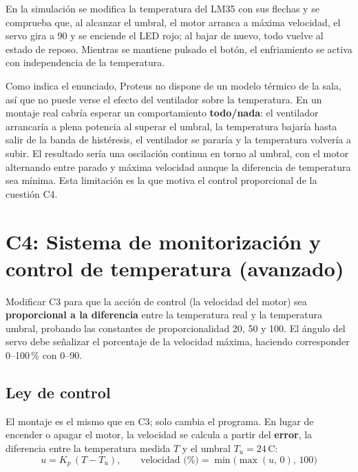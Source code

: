 \documentclass{upo-master}
\begin{document}
En la simulación se modifica la temperatura del LM35 con sus flechas y se
comprueba que, al alcanzar el umbral, el motor arranca a máxima velocidad, el
servo gira a 90\textdegree{} y se enciende el LED rojo; al bajar de nuevo, todo
vuelve al estado de reposo. Mientras se mantiene pulsado el botón, el
enfriamiento se activa con independencia de la temperatura.

Como indica el enunciado, Proteus no dispone de un modelo térmico de la
sala, así que no puede verse el efecto del ventilador sobre la temperatura.
En un montaje real cabría esperar un comportamiento \textbf{todo/nada}: el
ventilador arrancaría a plena potencia al superar el umbral, la temperatura
bajaría hasta salir de la banda de histéresis, el ventilador se pararía y la
temperatura volvería a subir. El resultado sería una oscilación continua en
torno al umbral, con el motor alternando entre parado y máxima velocidad
aunque la diferencia de temperatura sea mínima. Esta limitación es la que
motiva el control proporcional de la cuestión C4.

\clearpage
\section{C4: Sistema de monitorización y control de temperatura (avanzado)}

\begin{enunciado}
Modificar C3 para que la acción de control (la velocidad del motor) sea
\textbf{proporcional a la diferencia} entre la temperatura real y la
temperatura umbral, probando las constantes de proporcionalidad 20, 50
y 100. El ángulo del servo debe señalizar el porcentaje de la velocidad
máxima, haciendo corresponder 0--100\,\% con 0--90\textdegree.
\end{enunciado}

\subsection{Ley de control}

El montaje es el mismo que en C3; solo cambia el programa. En lugar de
encender o apagar el motor, la velocidad se calcula a partir del
\textbf{error}, la diferencia entre la temperatura medida $T$ y el umbral
$T_u = 24$\,\textdegree C:
\begin{equation}
  u = K_p \,(T - T_u), \qquad
  \text{velocidad (\%)} = \min\bigl(\max(u,\,0),\,100\bigr)
\end{equation}
\end{document}
